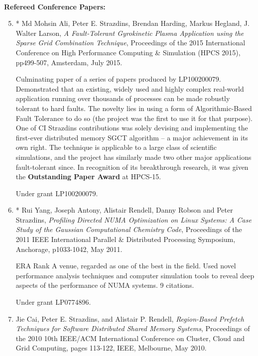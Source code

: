\documentclass[a4paper,oneside,12pt]{article}
\begin{document}
~\\[-2mm]
\textbf{Refereed Conference Papers:}
\begin{enumerate}
\setcounter{enumi}{4}

\item

* Md Mohsin Ali, Peter E. Strazdins, Brendan Harding, Markus Hegland,
J. Walter Larson, {\em A Fault-Tolerant Gyrokinetic Plasma Application          
using the Sparse Grid Combination Technique}, Proceedings of the 2015
International Conference on High Performance Computing \& Simulation
(HPCS 2015), pp499-507, Amsterdam, July 2015.

Culminating paper of a series of papers produced by
LP100200079. Demonstrated that an existing, widely used and highly
complex real-world application running over thousands of processes can
be made robustly tolerant to hard faults. The novelty lies in using a form
of Algorithmic-Based Fault Tolerance to do so (the project was the
first to use it for that purpose).  One of CI Strazdins contributions
was solely devising and implementing the first-ever distributed memory
SGCT algorithm -- a major achievement in its own right.
The technique is applicable to a large
class of scientific simulations, and the project has similarly made
two other major applications fault-tolerant since. 
In recognition of its breakthrough research, it was given the {\bf
  Outstanding Paper Award} at HPCS-15.

Under grant LP100200079.


\item * Rui Yang, Joseph Antony, Alistair Rendell, Danny Robson and
  Peter Strazdins, {\em Profiling Directed NUMA Optimization on Linux
    Systems: A Case Study of the Gaussian Computational Chemistry
    Code}, Proceedings of the 2011 IEEE International Parallel \&
  Distributed Processing Symposium, Anchorage, p1033-1042, May 2011.
  
  ERA Rank A venue, regarded as one of the best in the field. Used
  novel performance analysis techniques and computer simulation tools
  to reveal deep aspects of the performance of NUMA systems.  9
  citations.

 Under grant LP0774896.


\item Jie Cai, Peter E. Strazdins, and Alistair P. Rendell, {\em
Region-Based Prefetch Techniques for Software Distributed Shared Memory
Systems}, Proceedings of the  2010 10th IEEE/ACM International
Conference on Cluster, Cloud and Grid Computing, pages 113-122, IEEE,
Melbourne, May 2010.


\end{enumerate}
\end{document}
